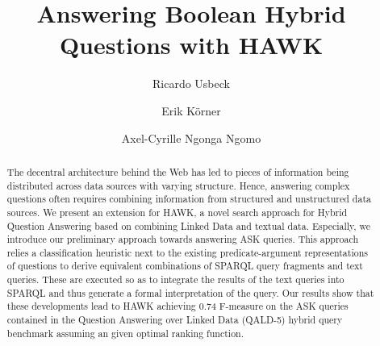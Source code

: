 \documentclass{llncs}
\begin{document}
\title{Answering Boolean Hybrid Questions with HAWK}
\author{
Ricardo Usbeck \and 
Erik Körner \and
Axel-Cyrille Ngonga Ngomo
}


\maketitle

\begin{abstract}
The decentral architecture behind the Web has led to pieces of information being distributed across data sources with varying structure. Hence, answering complex questions often requires combining information from structured and unstructured data sources.   
We present an extension for HAWK, a novel search approach for Hybrid Question Answering based on combining Linked Data and textual data.
Especially, we introduce our preliminary approach towards answering ASK queries. This approach relies a classification heuristic next to the existing predicate-argument representations of questions to derive equivalent combinations of SPARQL query fragments and text queries. These are executed so as to integrate the results of the text queries into SPARQL and thus generate a formal interpretation of the query.
%
Our results show that these developments lead to HAWK achieving 0.74 F-measure on the ASK queries contained in the Question Answering over Linked Data (QALD-5) hybrid query benchmark assuming an given optimal ranking function. %
\end{abstract}
\end{document}
